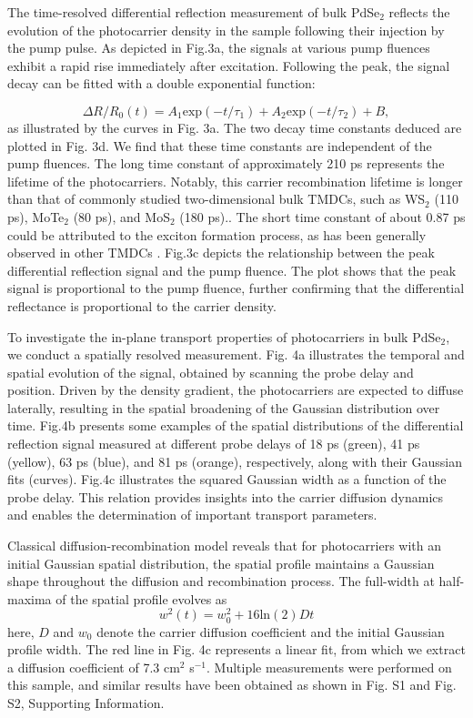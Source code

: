\documentclass[twoside,twocolumn,9pt]{article}
\begin{document}
The time-resolved differential reflection measurement of bulk PdSe$_2$ reflects the evolution of the photocarrier density in the sample following their injection by the pump pulse. As depicted in Fig.3a, the signals at various pump fluences exhibit a rapid rise immediately after excitation. Following the peak, the signal decay can be fitted with a double exponential function:

$$ {\Delta}R/R_0  (t)=A_1 \mathrm{exp}(-t/{\tau}_1 )+A_2 \mathrm{exp}(-t/{\tau}_2 )+B,$$
as illustrated by the curves in Fig. 3a. The two decay time constants deduced are plotted in Fig. 3d. We find that these time constants are independent of the pump fluences. The long time constant of approximately 210 ps represents the lifetime of the photocarriers. Notably, this carrier recombination lifetime is longer than that of commonly studied two-dimensional bulk TMDCs, such as WS$_2$  (110 ps),\cite{he2015spatiotemporal} MoTe$_2$ (80 ps),\cite{pan2018understanding} and MoS$_2$ (180 ps).\cite{kumar2013charge}. The short time constant of about 0.87 ps could be attributed to the exciton formation process, as has been generally observed in other TMDCs .\cite{ceballos2016exciton,2017Direct,2018Probing} Fig.3c depicts the relationship between the peak differential reflection signal and the pump fluence. The plot shows that the peak signal is proportional to the pump fluence, further confirming that the differential reflectance is proportional to the carrier density.



To investigate the in-plane transport properties of photocarriers in bulk PdSe$_2$, we conduct a spatially resolved measurement. Fig. 4a illustrates the temporal and spatial evolution of the signal, obtained by scanning the probe delay and position. Driven by the density gradient, the photocarriers are expected to diffuse laterally, resulting in the spatial broadening of the Gaussian distribution over time. Fig.4b presents some examples of the spatial distributions of the differential reflection signal measured at different probe delays of 18 ps (green), 41 ps (yellow), 63 ps (blue), and 81 ps (orange), respectively, along with their Gaussian fits (curves). Fig.4c illustrates the squared Gaussian width as a function of the probe delay. This relation provides insights into the carrier diffusion dynamics and enables the determination of important transport parameters. 



Classical diffusion-recombination model reveals that for photocarriers with an initial Gaussian spatial distribution, the spatial profile maintains a Gaussian shape throughout the diffusion and recombination process. The full-width at half-maxima of the spatial profile evolves as
$$ w^2(t)=w_0^2+16\mathrm{ln} (2) Dt$$
here, $D$ and $w_0$ denote the carrier diffusion coefficient and the initial Gaussian profile width.\cite{Ceballos2017Ultrafast} The red line in Fig. 4c represents a linear fit, from which we extract a diffusion coefficient of 7.3 cm$^{2}$ s$^{-1}$. Multiple measurements were performed on this sample, and similar results have been obtained as shown in Fig. S1 and Fig. S2, Supporting Information.
\end{document}
